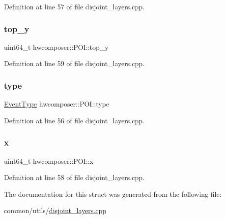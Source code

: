 Definition at line 57 of file disjoint\+\_\+layers.\+cpp.

\mbox{\label{structhwcomposer_1_1POI_ab841e57da5dd29224f07cdeb1536a9b1}} 
\subsubsection{\texorpdfstring{top\+\_\+y}{top\_y}}
{\footnotesize\ttfamily uint64\+\_\+t hwcomposer\+::\+P\+O\+I\+::top\+\_\+y}



Definition at line 59 of file disjoint\+\_\+layers.\+cpp.

\mbox{\label{structhwcomposer_1_1POI_acad56a09787f6dffa53a2e86e403d256}} 
\subsubsection{\texorpdfstring{type}{type}}
{\footnotesize\ttfamily \mbox{\hyperlink{namespacehwcomposer_a4600de8fd807f9d693b865758557d612}{Event\+Type}} hwcomposer\+::\+P\+O\+I\+::type}



Definition at line 56 of file disjoint\+\_\+layers.\+cpp.

\mbox{\label{structhwcomposer_1_1POI_ae6dc8defbc2baa83d67320f7344ffea2}} 
\subsubsection{\texorpdfstring{x}{x}}
{\footnotesize\ttfamily uint64\+\_\+t hwcomposer\+::\+P\+O\+I\+::x}



Definition at line 58 of file disjoint\+\_\+layers.\+cpp.



The documentation for this struct was generated from the following file\+:\begin{DoxyCompactItemize}
\item 
common/utils/\mbox{\hyperlink{disjoint__layers_8cpp}{disjoint\+\_\+layers.\+cpp}}\end{DoxyCompactItemize}
